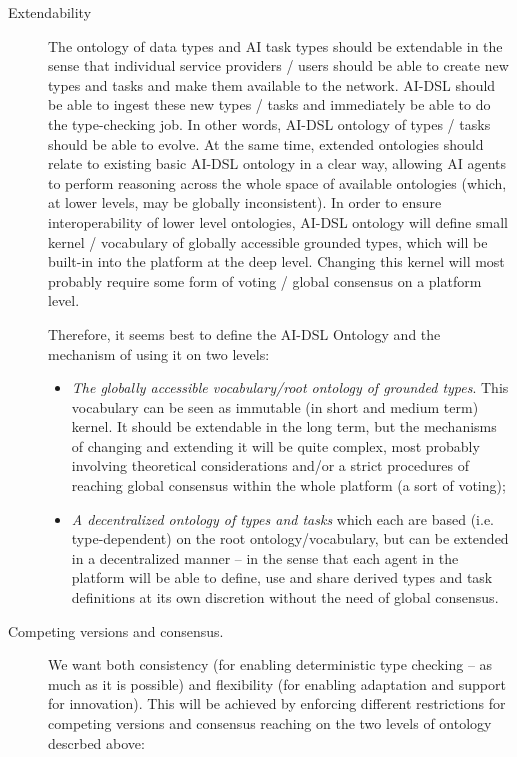 \documentclass[]{report}
\begin{document}
\begin{description} \item[Extendability] The ontology of data types and AI task
types should be extendable in the sense that individual service providers /
users should be able to create new types and tasks and make them available to
the network. AI-DSL should be able to ingest these new types / tasks and
immediately be able to do the type-checking job. In other words, AI-DSL ontology
of types / tasks should be able to evolve. At the same time, extended ontologies
should relate to existing basic AI-DSL ontology in a clear way, allowing AI
agents to perform reasoning across the whole space of available ontologies
(which, at lower levels, may be globally inconsistent). In order to ensure
interoperability of lower level ontologies, AI-DSL ontology will define small
kernel / vocabulary of globally accessible grounded types, which will be
built-in into the platform at the deep level. Changing this kernel will most
probably require some form of voting / global consensus on a platform level.

  Therefore, it seems best to define the AI-DSL Ontology and the mechanism of using
  it on two levels: \begin{itemize} \item \textit{The globally accessible
  vocabulary/root ontology of grounded types}. This vocabulary can be seen as
  immutable (in short and medium term) kernel. It should be extendable in the
  long term, but the mechanisms of changing and extending it will be quite
  complex, most probably involving theoretical considerations and/or a strict
  procedures of reaching global consensus within the whole platform (a sort of
  voting); \item \textit{A decentralized ontology of types and tasks} which each
  are based (i.e. type-dependent) on the root ontology/vocabulary, but can be
  extended in a decentralized manner -- in the sense that each agent in the
  platform will be able to define, use and share derived types and task
  definitions at its own discretion without the need of global consensus.
  \end{itemize}

  \item[Competing versions and consensus.] We want both consistency (for
  enabling deterministic type checking -- as much as it is possible) and
  flexibility (for enabling adaptation and support for innovation). This will be
  achieved by enforcing different restrictions for competing versions and
  consensus reaching on the two levels of ontology descrbed above:


\end{description}
\end{document}
